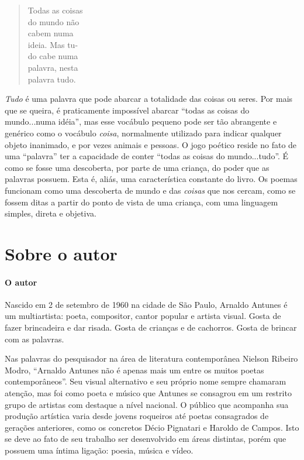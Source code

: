 \documentclass[11pt]{extarticle}
\begin{document}
\begin{verse}
Todas as coisas\\
do mundo não\\
cabem numa\\
ideia. Mas tu-\\
do cabe numa\\
palavra, nesta\\
palavra tudo.\\
\end{verse}

\textit{Tudo} é uma palavra que pode abarcar a totalidade das coisas ou seres. Por mais
que se queira, é praticamente impossível abarcar ``todas as coisas do mundo...numa idéia'',
mas esse vocábulo pequeno pode ser tão abrangente e genérico como o vocábulo \textit{coisa},
normalmente utilizado para indicar qualquer objeto inanimado, e por vezes animais e pessoas. 
O jogo poético reside no fato de uma ``palavra'' ter a capacidade de conter ``todas
as coisas do mundo...tudo''. É como se fosse uma descoberta, por parte de uma criança, do
poder que as palavras possuem. Esta é, aliás, uma característica constante do livro. Os
poemas funcionam como uma descoberta de mundo e das \textit{coisas} que nos cercam, como
se fossem ditas a partir do ponto de vista de uma criança, com uma linguagem simples,
direta e objetiva.


\reversemarginpar
\marginparwidth=5cm



\section{Sobre o autor}


\paragraph{O autor}


Nascido em 2 de setembro de 1960 na cidade de São Paulo, Arnaldo Antunes é um multiartista: 
poeta, compositor, cantor popular e artista visual.
Gosta de fazer brincadeira e dar risada. Gosta de crianças e de cachorros.
Gosta de brincar com as palavras.

Nas palavras do pesquisador na área de literatura contemporânea Nielson Ribeiro Modro, 
``Arnaldo Antunes não é apenas mais um entre os muitos poetas contemporâneos''.
Seu visual alternativo e seu próprio nome sempre chamaram atenção, mas foi como poeta 
e músico que Antunes se consagrou em um
restrito grupo de artistas com destaque a nível nacional. O público que acompanha sua
produção artística varia desde jovens roqueiros até poetas consagrados de gerações anteriores, como os concretos Décio
Pignatari e Haroldo de Campos. Isto se deve ao fato de seu trabalho ser desenvolvido em
áreas distintas, porém que possuem uma íntima ligação: poesia, música e vídeo.
\end{document}
